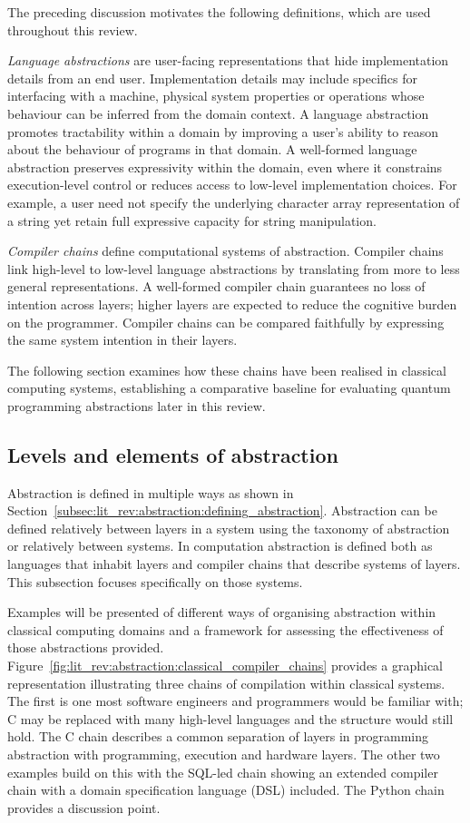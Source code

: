 The preceding discussion motivates the following definitions, which are used throughout this review.

\textit{Language abstractions} are user-facing representations that hide implementation details from an end user.
Implementation details may include specifics for interfacing with a machine, physical system properties or operations whose behaviour can be inferred from the domain context.
A language abstraction promotes tractability within a domain by improving a user's ability to reason about the behaviour of programs in that domain.
A well-formed language abstraction preserves expressivity within the domain, even where it constrains execution-level control or reduces access to low-level implementation choices.
For example, a user need not specify the underlying character array representation of a string yet retain full expressive capacity for string manipulation.

\textit{Compiler chains} define computational systems of abstraction.
Compiler chains link high-level to low-level language abstractions by translating from more to less general representations.
A well-formed compiler chain guarantees no loss of intention across layers; higher layers are expected to reduce the cognitive burden on the programmer.
Compiler chains can be compared faithfully by expressing the same system intention in their layers.

The following section examines how these chains have been realised in classical computing systems, establishing a comparative baseline for evaluating quantum programming abstractions later in this review.

\subsection{Levels and elements of abstraction}\label{subsec:lit_rev:abstraction:levels_elements}
Abstraction is defined in multiple ways as shown in Section~\ref{subsec:lit_rev:abstraction:defining_abstraction}.
Abstraction can be defined relatively between layers in a system using the taxonomy of abstraction~\cite{aho2022abstractions} or relatively between systems.
In computation abstraction is defined both as languages that inhabit layers and compiler chains that describe systems of layers.
This subsection focuses specifically on those systems.

Examples will be presented of different ways of organising abstraction within classical computing domains and a framework for assessing the effectiveness of those abstractions provided.
Figure~\ref{fig:lit_rev:abstraction:classical_compiler_chains} provides a graphical representation illustrating three chains of compilation within classical systems.
The first is one most software engineers and programmers would be familiar with; C may be replaced with many high-level languages and the structure would still hold.
The C chain describes a common separation of layers in programming abstraction with programming, execution and hardware layers.
The other two examples build on this with the SQL-led chain showing an extended compiler chain with a domain specification language (DSL) included.
The Python chain provides a discussion point.


